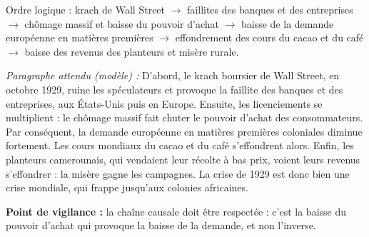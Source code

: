\documentclass[11pt]{article}
\begin{document}
\begin{corrige}
Ordre logique : krach de Wall Street $\rightarrow$ faillites des banques et des entreprises $\rightarrow$ chômage massif et baisse du pouvoir d'achat $\rightarrow$ baisse de la demande européenne en matières premières $\rightarrow$ effondrement des cours du cacao et du café $\rightarrow$ baisse des revenus des planteurs et misère rurale.

\emph{Paragraphe attendu (modèle) :} D'abord, le krach boursier de Wall Street, en octobre 1929, ruine les spéculateurs et provoque la faillite des banques et des entreprises, aux États-Unis puis en Europe. Ensuite, les licenciements se multiplient : le chômage massif fait chuter le pouvoir d'achat des consommateurs. Par conséquent, la demande européenne en matières premières coloniales diminue fortement. Les cours mondiaux du cacao et du café s'effondrent alors. Enfin, les planteurs camerounais, qui vendaient leur récolte à bas prix, voient leurs revenus s'effondrer : la misère gagne les campagnes. La crise de 1929 est donc bien une crise mondiale, qui frappe jusqu'aux colonies africaines.

\textbf{Point de vigilance :} la chaîne causale doit être respectée : c'est la baisse du pouvoir d'achat qui provoque la baisse de la demande, et non l'inverse.
\end{corrige}
\end{document}
